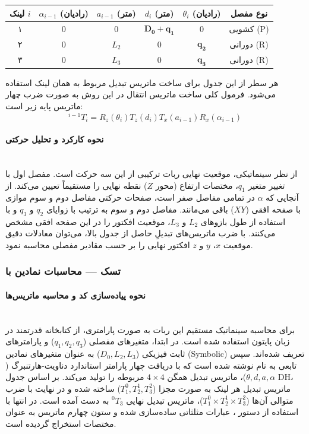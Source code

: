 \documentclass{article}
\begin{document}
\begin{table}[htbp]
	\centering
	\renewcommand{\arraystretch}{1.5}
	\begin{tabular}{|c|c|c|c|c|c|}
		\hline
		\textbf{لینک $i$} & $\alpha_{i-1}$ \textbf{(رادیان)} & $a_{i-1}$ \textbf{(متر)} & $d_i$ \textbf{(متر)} & $\theta_i$ \textbf{(رادیان)} & \textbf{نوع مفصل} \\ \hline
		۱ & 0 & 0 & $\mathbf{D_0 + q_1}$ & 0 & کشویی (P) \\ \hline
		۲ & 0 & $L_2$ & 0 & $\mathbf{q_2}$ & دورانی (R) \\ \hline
		۳ & 0 & $L_3$ & 0 & $\mathbf{q_3}$ & دورانی (R) \\ \hline
	\end{tabular}
\end{table}

هر سطر از این جدول برای ساخت ماتریس تبدیل مربوط به همان لینک استفاده می‌شود. فرمول کلی ساخت ماتریس انتقال در این روش به صورت ضرب چهار ماتریس پایه زیر است:
$$ ^{i-1}T_i = R_z(\theta_i) T_z(d_i) T_x(a_{i-1}) R_x(\alpha_{i-1}) $$

\paragraph{نحوه کارکرد و تحلیل حرکتی}\mbox{}\\
از نظر سینماتیکی، موقعیت نهایی ربات ترکیبی از این سه حرکت است. مفصل اول با تغییر متغیر $q_1$، مختصات ارتفاع (محور $Z$) نقطه نهایی را مستقیماً تعیین می‌کند. از آنجایی که $\alpha$ در تمامی مفاصل صفر است، صفحات حرکتی مفاصل دوم و سوم موازی با صفحه افقی ($XY$) باقی می‌مانند. مفاصل دوم و سوم به ترتیب با زوایای $q_2$ و $q_3$ و با استفاده از طول بازوهای $L_2$ و $L_3$، موقعیت افکتور را در این صفحه افقی مشخص می‌کنند. با ضرب ماتریس‌های تبدیلِ حاصل از جدول بالا، می‌توان معادلات دقیق موقعیت $x$، $y$ و $z$ افکتور نهایی را بر حسب مقادیر مفصلی محاسبه نمود.
\subsubsection{تسک — محاسبات نمادین با }
\paragraph{نحوه پیاده‌سازی کد و محاسبه ماتریس‌ها}\mbox{}\\
برای محاسبه سینماتیک مستقیم این ربات به صورت پارامتری، از کتابخانه قدرتمند  در زبان پایتون استفاده شده است. در ابتدا، متغیرهای مفصلی ($q_1, q_2, q_3$) و پارامترهای ثابت فیزیکی ($D_0, L_2, L_3$) به عنوان متغیرهای نمادین (Symbolic) تعریف شده‌اند. سپس تابعی به نام  نوشته شده است که با دریافت چهار پارامتر استاندارد دناویت-هارتنبرگ ($\theta, d, a, \alpha$)، ماتریس تبدیل همگن $4 \times 4$ مربوطه را تولید می‌کند. 
بر اساس جدول DH، ماتریس تبدیل هر لینک به صورت مجزا ($T_1^0, T_2^1, T_3^2$) ساخته شده و در نهایت با ضرب متوالی آن‌ها ($T_1^0 \times T_2^1 \times T_3^2$)، ماتریس تبدیل نهایی $^0T_3$ به دست آمده است. در انتها با استفاده از دستور ، عبارات مثلثاتی ساده‌سازی شده و ستون چهارم ماتریس به عنوان مختصات استخراج گردیده است.
\end{document}
